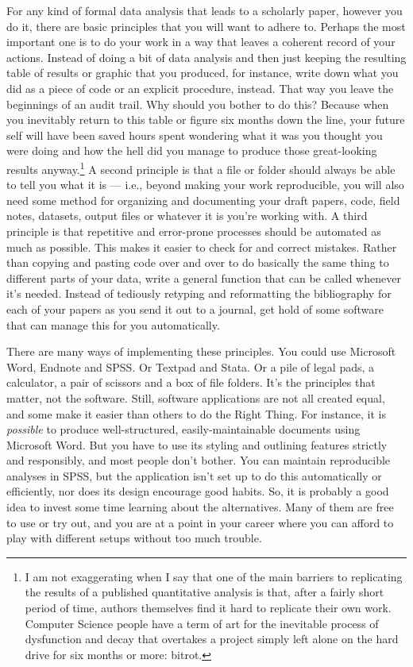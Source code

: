 \documentclass[11pt,article,oneside]{memoir}
\begin{document}
For any kind of formal data analysis that leads to a scholarly paper, however you do it, there are basic principles that you will want to adhere to. Perhaps the most important one is to do your work in a way that leaves a coherent record of your actions. Instead of doing a bit of data analysis and then just keeping the resulting table of results or graphic that you produced, for instance, write down what you did as a piece of code or an explicit procedure, instead. That way you leave the beginnings of an audit trail. Why should you bother to do this? Because when you inevitably return to this table or figure six months down the line, your future self will have been saved hours spent wondering what it was you thought you were doing and how the hell did you manage to produce those great-looking results anyway.\footnote{I am not exaggerating when I say that one of the main barriers to replicating the results of a published quantitative analysis is that, after a fairly short period of time, authors themselves find it hard to replicate their own work. Computer Science people have a term of art for the inevitable process of dysfunction and decay that overtakes a project simply left alone on the hard drive for six months or more: bitrot.} A second principle is that a file or folder should always be able to tell you what it is --- i.e., beyond making your work reproducible, you will also need some method for organizing and documenting your draft papers, code, field notes, datasets, output files or whatever it is you're working with. A third principle is that repetitive and error-prone processes should be automated as much as possible. This makes it easier to check for and correct mistakes. Rather than copying and pasting code over and over to do basically the same thing to different parts of your data, write a general function that can be called whenever it's needed. Instead of tediously retyping and reformatting the bibliography for each of your papers as you send it out to a journal, get hold of some software that can manage this for you automatically.

There are many ways of implementing these principles. You could use Microsoft Word, Endnote and SPSS. Or Textpad and Stata. Or a pile of legal pads, a calculator, a pair of scissors and a box of file folders. It's the principles that matter, not the software. Still, software applications are not all created equal, and some make it easier than others to do the Right Thing. For instance, it is \emph{possible} to produce well-structured, easily-maintainable documents using Microsoft Word. But you have to use its styling and outlining features strictly and responsibly, and most people don't bother. You can maintain reproducible analyses in SPSS, but the application isn't set up to do this automatically or efficiently, nor does its design encourage good habits. So, it is probably a good idea to invest some time learning about the alternatives. Many of them are free to use or try out, and you are at a point in your career where you can afford to play with different setups without too much trouble.
\end{document}
